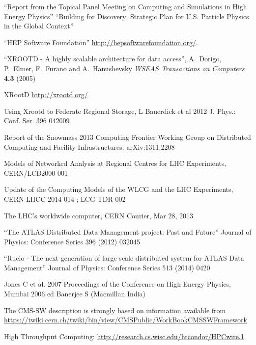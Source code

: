 \begin{thebibliography}{99}
 ``Report from the Topical Panel Meeting on Computing and
Simulations in High Energy Physics''
 ``Building for Discovery: Strategic Plan for U.S. Particle Physics in the Global Context''

 ``HEP Software Foundation'' \url{http://hepsoftwarefoundation.org/}.

 ``XROOTD - A highly scalable architecture for data access'', A.\ Dorigo, P.\ Elmer, F.\ Furano and A.\ Hanushevsky {\it WSEAS Transactions on Computers} {\bf 4.3} (2005)

 XRootD \url{http://xrootd.org/}

 Using Xrootd to Federate Regional Storage, L Bauerdick et al 2012 J. Phys.: Conf. Ser. 396 042009

 Report of the Snowmass 2013 Computing Frontier Working Group on Distributed Computing and Facility Infrastructures. arXiv:1311.2208

 Models of Networked Analysis at Regional Centres for LHC Experiments, CERN/LCB2000-001

 Update of the Computing Models of the WLCG and the LHC Experiments, CERN-LHCC-2014-014 ; LCG-TDR-002

 The LHC’s worldwide computer, CERN Courier, Mar 28, 2013

 ``The ATLAS Distributed Data Management project: Past and Future'' Journal of Physics: Conference Series 396 (2012) 032045

 ``Rucio - The next generation of large scale distributed system for ATLAS Data Management'' Journal of Physics: Conference Series 513 (2014) 0420


 Jones C et al. 2007 Proceedings of the Conference on High Energy Physics, Mumbai 2006 ed Banerjee S (Macmillan India)

 The CMS-SW description is strongly based on information available from \url{https://twiki.cern.ch/twiki/bin/view/CMSPublic/WorkBookCMSSWFramework}

 High Throughput Computing: \url{http://research.cs.wisc.edu/htcondor/HPCwire.1}


\end{thebibliography}
